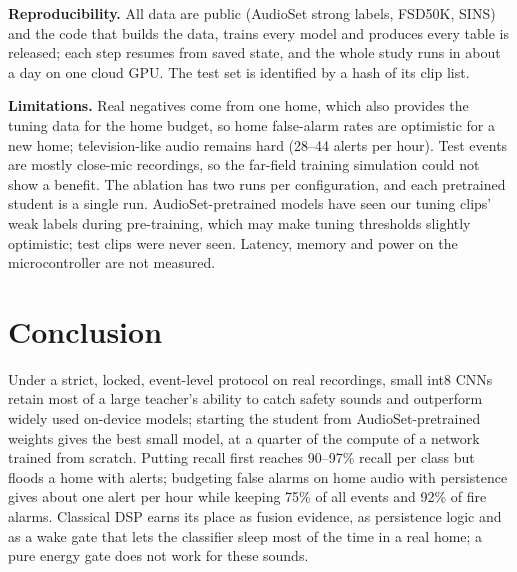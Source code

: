 \documentclass[conference]{IEEEtran}
\begin{document}
\textbf{Reproducibility.} All data are public (AudioSet strong labels, FSD50K, SINS) and the
code that builds the data, trains every model and produces every table is released; each step
resumes from saved state, and the whole study runs in about a day on one cloud GPU. The test set
is identified by a hash of its clip list.

\textbf{Limitations.} Real negatives come from one home, which also provides the tuning data for
the home budget, so home false-alarm rates are optimistic for a new home; television-like audio
remains hard (28--44 alerts per hour). Test events are mostly close-mic recordings, so the
far-field training simulation could not show a benefit. The ablation has two runs per
configuration, and each pretrained student is a single run. AudioSet-pretrained models have seen
our tuning clips' weak labels during pre-training, which may make tuning thresholds slightly
optimistic; test clips were never seen. Latency, memory and power on the microcontroller are not
measured.

\section{Conclusion}
Under a strict, locked, event-level protocol on real recordings, small int8 CNNs retain most of
a large teacher's ability to catch safety sounds and outperform widely used on-device models;
starting the student from AudioSet-pretrained weights gives the best small model, at a quarter of
the compute of a network trained from scratch. Putting recall first reaches 90--97\% recall per
class but floods a home with alerts; budgeting false alarms on home audio with persistence gives
about one alert per hour while keeping 75\% of all events and 92\% of fire alarms. Classical DSP
earns its place as fusion evidence, as persistence logic and as a wake gate that lets the
classifier sleep most of the time in a real home; a pure energy gate does not work for these
sounds.



\end{document}
